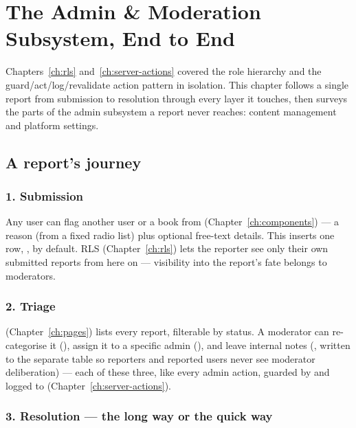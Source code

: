 \chapter{The Admin \& Moderation Subsystem, End to End}
\label{ch:admin}

Chapters~\ref{ch:rls} and~\ref{ch:server-actions} covered the role hierarchy and the guard/act/log/revalidate action pattern in isolation. This chapter follows a single report from submission to resolution through every layer it touches, then surveys the parts of the admin subsystem a report never reaches: content management and platform settings.

\section{A report's journey}

\subsection*{1. Submission}

Any user can flag another user or a book from  (Chapter~\ref{ch:components}) — a reason (from a fixed radio list) plus optional free-text details. This inserts one  row, ,  by default. RLS (Chapter~\ref{ch:rls}) lets the reporter see only their own submitted reports from here on — visibility into the report's fate belongs to moderators.

\subsection*{2. Triage}

 (Chapter~\ref{ch:pages}) lists every report, filterable by status. A moderator can re-categorise it (), assign it to a specific admin (), and leave internal notes (, written to the separate  table so reporters and reported users never see moderator deliberation) — each of these three, like every admin action, guarded by  and logged to  (Chapter~\ref{ch:server-actions}).

\subsection*{3. Resolution — the long way or the quick way}

